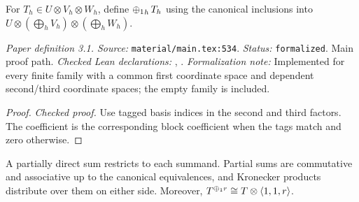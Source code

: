 \renewcommand{\thetheorem}{3.1}
\begin{definition}
\label{def:partial-direct-sum}
\leanok
{}
For $T_h\in U\otimes V_h\otimes W_h$, define $\mathop{\mathbin{\oplus_1}}_hT_h$ using the canonical inclusions into $U\otimes(\bigoplus_hV_h)\otimes(\bigoplus_hW_h)$.
\end{definition}

\noindent\textit{Paper definition 3.1. Source:} \texttt{material/main.tex:534}.
\textit{Status:} \texttt{formalized}. Main proof path.
\textit{Checked Lean declarations:} , .
\textit{Formalization note:} Implemented for every finite family with a common first coordinate space and dependent second/third coordinate spaces; the empty family is included.

\begin{proof}
\leanok
\textit{Checked proof.} Use tagged basis indices in the second and third factors. The coefficient is the corresponding block coefficient when the tags match and zero otherwise.
\end{proof}

\renewcommand{\thetheorem}{3.2}
\begin{lemma}
\label{diamondplus-basic}
\manuscriptproof
{}
\leanok
A partially direct sum restricts to each summand. Partial sums are commutative and associative up to the canonical equivalences, and Kronecker products distribute over them on either side. Moreover, $T^{\mathbin{\oplus_1} r}\cong T\otimes\langle1,1,r\rangle$.
\end{lemma}

